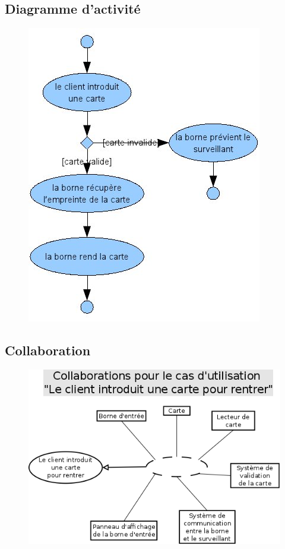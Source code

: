 \documentclass[a4paper]{article}
\begin{document}
\subsection{Diagramme d'activit\'e}
\begin{figure}[!ht]
\centering
\includegraphics[scale=.7]{imgs/act_carterentrer.jpg}
\end{figure}

\subsection{Collaboration}
\begin{figure}[!ht]
\centering
\includegraphics[scale=.5]{collaborations/_carte_entree.png}
\end{figure}
\end{document}
